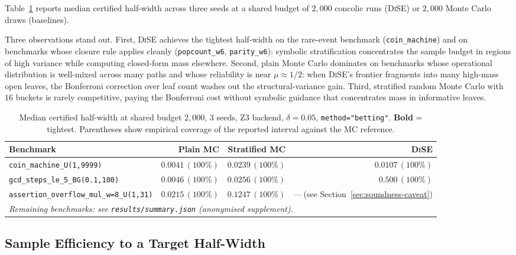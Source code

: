 \documentclass[runningheads]{llncs}
\providecommand{\Cref}[1]{Section~\ref{#1}}
\newcommand{\mutrue}{\mu}
\newcommand{\toolname}{\textsc{DiSE}}
\newcommand{\code}[1]{\texttt{#1}}
\begin{document}
Table~\ref{tab:half-widths} reports median certified half-width across
three seeds at a shared budget of $2{,}000$ concolic runs (\toolname{})
or $2{,}000$ Monte Carlo draws (baselines).

Three observations stand out.  First, \toolname{} achieves the
tightest half-width on the rare-event benchmark
(\code{coin\_machine}) and on benchmarks whose closure rule applies
cleanly (\code{popcount\_w6}, \code{parity\_w6}): symbolic
stratification concentrates the sample budget in regions of high
variance while computing closed-form mass elsewhere.  Second, plain
Monte Carlo dominates on benchmarks whose operational distribution is
well-mixed across many paths and whose reliability is near
$\mutrue \approx 1/2$: when \toolname{}'s frontier fragments into
many high-mass open leaves, the Bonferroni correction over leaf count
washes out the structural-variance gain.  Third, stratified random
Monte Carlo with $16$ buckets is rarely competitive, paying the
Bonferroni cost without symbolic guidance that concentrates mass in
informative leaves.

\begin{table}[t]
  \centering
  \caption{Median certified half-width at shared budget $2{,}000$,
    $3$ seeds, Z3 backend, $\delta = 0.05$, \code{method="betting"}.
    \textbf{Bold} = tightest.  Parentheses show empirical coverage
    of the reported interval against the MC reference.}
  \label{tab:half-widths}
  \begin{tabular}{lrrr}
    \toprule
    Benchmark
      & Plain MC & Stratified MC & \toolname{} \\
    \midrule
    \code{coin\_machine\_U(1,9999)}
      & $0.0041\,(100\%)$ & $0.0239\,(100\%)$
      & $\mathbf{0.0107}\,(100\%)$ \\
    \code{gcd\_steps\_le\_5\_BG(0.1,100)}
      & $\mathbf{0.0046}\,(100\%)$ & $0.0256\,(100\%)$
      & $0.500\,(100\%)$ \\
    \code{assertion\_overflow\_mul\_w=8\_U(1,31)}
      & $\mathbf{0.0215}\,(100\%)$ & $0.1247\,(100\%)$
      & ---\,(see \Cref{sec:soundness-caveat}) \\
    \multicolumn{4}{l}{\emph{Remaining benchmarks:
      see \code{results/summary.json} (anonymised supplement).}} \\
    \bottomrule
  \end{tabular}
\end{table}

\subsection{Sample Efficiency to a Target Half-Width}\label{sec:budget-curve}
\end{document}
